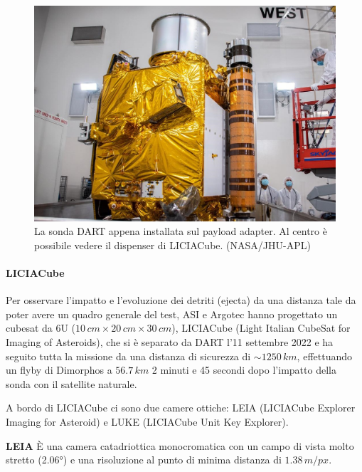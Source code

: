 \documentclass[a4paper,11pt,openright]{book}
\begin{document}
\begin{figure}
    \centering
    \includegraphics[scale=0.26]{figure/dart_cleanroom.jpg}
    \caption[La sonda DART nella clean room.]{La sonda DART appena installata sul payload adapter. Al centro è possibile vedere il dispenser di LICIACube. (NASA/JHU-APL)}
    \label{fig:dart_cleanroom}
\end{figure}

\paragraph*{LICIACube}
Per osservare l'impatto e l'evoluzione dei detriti (ejecta) da una distanza tale da poter avere un quadro generale del test, ASI e Argotec hanno progettato un cubesat da 6U ($10\,cm\times 20\,cm\times 30\,cm$), LICIACube (Light Italian CubeSat for Imaging of Asteroids), che si è separato da DART l'11 settembre 2022 e ha seguito tutta la missione da una distanza di sicurezza di $\sim 1250\,km$, effettuando un flyby di Dimorphos a $56.7\,km$ 2 minuti e 45 secondi dopo l'impatto della sonda con il satellite naturale.

A bordo di LICIACube ci sono due camere ottiche: LEIA (LICIACube Explorer Imaging for Asteroid) e LUKE (LICIACube Unit Key Explorer).

\qquad \small{\textbf{LEIA}} È una camera catadriottica monocromatica con un campo di vista molto stretto (2.06°) e una risoluzione al punto di minima distanza di $1.38\,m/px$.
\end{document}
